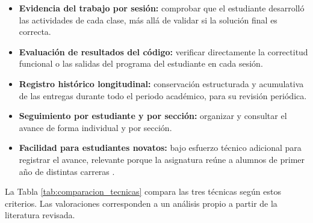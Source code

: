 \begin{itemize}
    \item \textbf{Evidencia del trabajo por sesión:} comprobar que el estudiante desarrolló las actividades de cada clase, más allá de validar si la solución final es correcta.
    \item \textbf{Evaluación de resultados del código:} verificar directamente la correctitud funcional o las salidas del programa del estudiante en cada sesión.
    \item \textbf{Registro histórico longitudinal:} conservación estructurada y acumulativa de las entregas durante todo el periodo académico, para su revisión periódica.
    \item \textbf{Seguimiento por estudiante y por sección:} organizar y consultar el avance de forma individual y por sección.
    \item \textbf{Facilidad para estudiantes novatos:} bajo esfuerzo técnico adicional para registrar el avance, relevante porque la asignatura reúne a alumnos de primer año de distintas carreras \cite{uv2026carreras}.
\end{itemize}

La Tabla \ref{tab:comparacion_tecnicas} compara las tres técnicas según estos criterios. Las valoraciones corresponden a un análisis propio a partir de la literatura revisada.

\begin{table}[H]
\centering
\caption{Comparación de las técnicas de seguimiento según los criterios definidos.}
\label{tab:comparacion_tecnicas}
\end{table}


